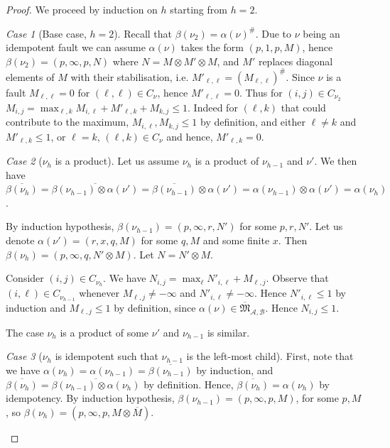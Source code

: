 \documentclass[10pt,a4paper]{amsart}
\theoremstyle{definition}
\numberwithin{equation}{section}
\theoremstyle{remark}
\newtheorem{case}{Case}
\newcommand{\ideal}{\mathfrak{M}}
\newcommand{\autA}{\mathcal{A}}
\newcommand{\autB}{\mathcal{B}}
\theoremstyle{remark}
\begin{document}
\begin{proof}
We proceed by induction on $h$ starting from $h=2$.

\begin{case}[Base case, $h=2$]

Recall that $\beta(\nu_2) = \alpha(\nu)^\#$. Due to $\nu$ being an idempotent fault we can assume $\alpha(\nu)$ takes the form $(p,1,p,M)$, hence $\beta(\nu_2) = (p,\infty,p, N)$ where $N = M \otimes M' \otimes M$, and $M'$ replaces diagonal elements of $M$ with their stabilisation, i.e. $M'_{\ell,\ell}=(M_{\ell,\ell})^{\#}$. Since $\nu$ is a fault $M_{\ell,\ell} = 0$ for $(\ell,\ell) \in C_{\nu}$, hence $M'_{\ell,\ell} = 0$. Thus for $(i,j)\in C_{\nu_2}$ $M_{i,j} = \max_{\ell,k} M_{i,\ell}+ M'_{\ell,k} +  M_{k,j} \le 1$. Indeed for $(\ell,k)$ that could contribute to the maximum, $ M_{i,\ell}, M_{k,j} \le 1$ by definition, and either $\ell \neq k$ and $M'_{\ell,k} \le 1$, or $\ell = k$, $(\ell,k) \in C_{\nu}$ and hence, $M'_{\ell,k} = 0$. 
\end{case}

\begin{case}[$\nu_h$ is a product]
Let us assume $\nu_h$ is a product of $\nu_{h-1}$ and $\nu'$.
We then have $\overline{\beta(\nu_h)} = \overline{\beta(\nu_{h-1}) \otimes \alpha(\nu')} = \overline{\beta(\nu_{h-1})} \otimes \alpha(\nu') = \alpha(\nu_{h-1}) \otimes \alpha(\nu') = \alpha(\nu_{h})$.

By induction hypothesis,  $\beta(\nu_{h-1}) = (p,\infty,r,N')$ for some $p,r, N'$. Let us denote $\alpha(\nu') = (r,x,q,M)$ for some $q,M$ and some finite $x$. Then $\beta(\nu_h) = (p,\infty,q,N'\otimes M)$. Let $N = N'\otimes M$.

Consider $(i,j) \in C_{\nu_h}$. We have $N_{i,j} = \max_{\ell} N'_{i,\ell} + M_{\ell,j}$. Observe that $(i,\ell)\in C_{\nu_{h-1}}$ whenever $M_{\ell,j} \ne -\infty$ and $N'_{i,\ell} \ne -\infty$. Hence $N'_{i,\ell} \le 1$ by induction and $M_{\ell,j}\le 1$ by definition, since $\alpha(\nu) \in\overline{\ideal}_{\autA,\autB}$. Hence $N_{i,j} \le 1$.

The case $\nu_h$ is a product of some $\nu'$ and $\nu_{h-1}$ is similar.
\end{case}

\begin{case}[$\nu_h$ is idempotent such that $\nu_{h-1}$ is the left-most child]

First, note that we have $\alpha(\nu_h) = \alpha(\nu_{h-1})= \overline{\beta(\nu_{h-1})}$ by induction, and $\overline{\beta(\nu_{h})} = \overline{\beta(\nu_{h-1}) \otimes \alpha(\nu_{h})}$ by definition. Hence, $\overline{\beta(\nu_{h})} = \alpha(\nu_h)$ by idempotency. By induction hypothesis, $\beta(\nu_{h-1}) = (p,\infty,p,M)$, for some $p,M$, so $\beta(\nu_h)= (p,\infty,p,M\otimes \overline{M})$. 


\end{case}
\end{proof}
\end{document}
